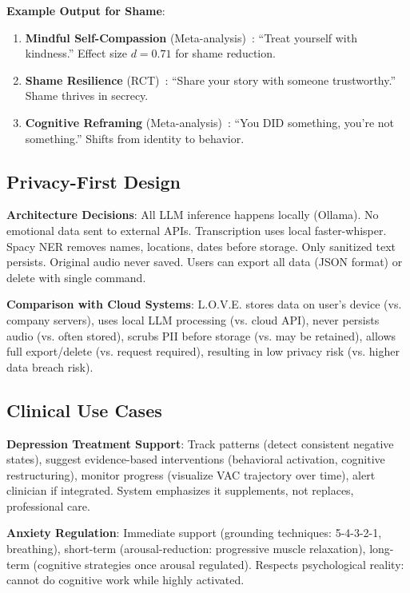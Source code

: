 \textbf{Example Output for Shame}:
\begin{enumerate}
    \item \textbf{Mindful Self-Compassion} (Meta-analysis)~\cite{ferrari2019}: ``Treat yourself with kindness.'' Effect size $d=0.71$ for shame reduction.
    \item \textbf{Shame Resilience} (RCT)~\cite{brown2006}: ``Share your story with someone trustworthy.'' Shame thrives in secrecy.
    \item \textbf{Cognitive Reframing} (Meta-analysis)~\cite{hofmann2012}: ``You DID something, you're not something.'' Shifts from identity to behavior.
\end{enumerate}

\subsection{Privacy-First Design}

\textbf{Architecture Decisions}: All LLM inference happens locally (Ollama). No emotional data sent to external APIs. Transcription uses local faster-whisper. Spacy NER removes names, locations, dates before storage. Only sanitized text persists. Original audio never saved. Users can export all data (JSON format) or delete with single command.

\textbf{Comparison with Cloud Systems}: L.O.V.E. stores data on user's device (vs. company servers), uses local LLM processing (vs. cloud API), never persists audio (vs. often stored), scrubs PII before storage (vs. may be retained), allows full export/delete (vs. request required), resulting in low privacy risk (vs. higher data breach risk).

\subsection{Clinical Use Cases}

\textbf{Depression Treatment Support}: Track patterns (detect consistent negative states), suggest evidence-based interventions (behavioral activation, cognitive restructuring), monitor progress (visualize VAC trajectory over time), alert clinician if integrated. System emphasizes it supplements, not replaces, professional care.

\textbf{Anxiety Regulation}: Immediate support (grounding techniques: 5-4-3-2-1, breathing), short-term (arousal-reduction: progressive muscle relaxation), long-term (cognitive strategies once arousal regulated). Respects psychological reality: cannot do cognitive work while highly activated.

